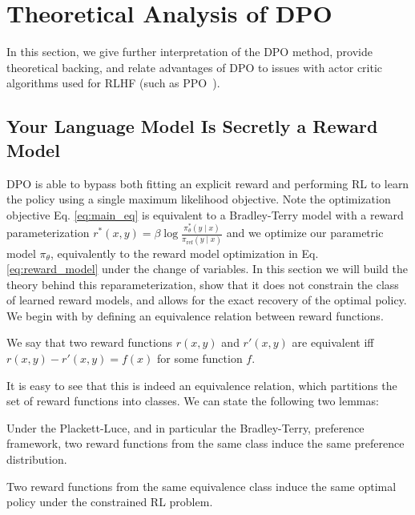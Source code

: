 \section{Theoretical Analysis of DPO} In this section, we give further interpretation of the DPO method, provide theoretical backing, and relate advantages of DPO to issues with actor critic algorithms used for RLHF (such as PPO~\cite{schulman2017proximal}).

\label{sec:theory}

\subsection{Your Language Model Is Secretly a Reward Model} DPO is able to bypass both {fitting an explicit reward} and performing RL to learn the policy using a single maximum likelihood objective. Note the optimization objective Eq. \ref{eq:main_eq} is equivalent to a Bradley-Terry model with a reward parameterization $r^*(x, y) = \beta \log\frac{\pi^*_\theta(y \mid x)}{\pi_\text{ref}(y \mid x)}$ and we optimize our parametric model $\pi_{\theta}$, equivalently to the reward model optimization in Eq. \ref{eq:reward_model} under the change of variables. In this section we will build the theory behind this reparameterization, show that it does not constrain the class of learned reward models, and allows for the exact recovery of the optimal policy. We begin with by defining an equivalence relation between reward functions.

\begin{definition}
We say that two reward functions $r(x, y)$ and $r'(x, y)$ are equivalent iff ${r(x, y)-r'(x, y) = f(x)}$ for some function $f$.     
\end{definition}

It is easy to see that this is indeed an equivalence relation, which partitions the set of reward functions into classes. We can state the following two lemmas:

\begin{lemma}\label{lemma:same_prefrence} Under the Plackett-Luce, and in particular the Bradley-Terry, preference framework, two reward functions from the same class induce the same preference distribution.
\end{lemma}

\begin{lemma}\label{lemma:same_policy}
    Two reward functions from the same equivalence class induce the same optimal policy under the constrained RL problem.
\end{lemma}

